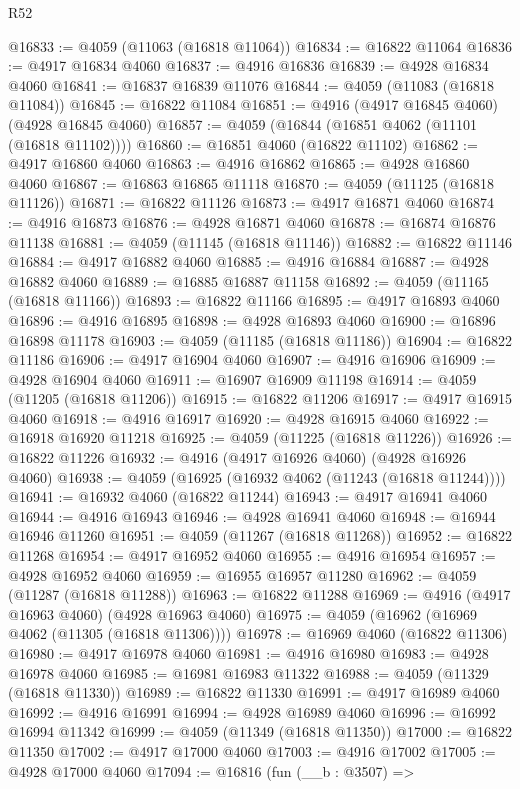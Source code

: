 \begin{lexlean}{R52}
\begin{coremodule}
@16833 := @4059 (@11063 (@16818 @11064))
@16834 := @16822 @11064
@16836 := @4917 @16834 @4060
@16837 := @4916 @16836
@16839 := @4928 @16834 @4060
@16841 := @16837 @16839 @11076
@16844 := @4059 (@11083 (@16818 @11084))
@16845 := @16822 @11084
@16851 := @4916 (@4917 @16845 @4060) (@4928 @16845 @4060)
@16857 := @4059 (@16844 (@16851 @4062 (@11101 (@16818 @11102))))
@16860 := @16851 @4060 (@16822 @11102)
@16862 := @4917 @16860 @4060
@16863 := @4916 @16862
@16865 := @4928 @16860 @4060
@16867 := @16863 @16865 @11118
@16870 := @4059 (@11125 (@16818 @11126))
@16871 := @16822 @11126
@16873 := @4917 @16871 @4060
@16874 := @4916 @16873
@16876 := @4928 @16871 @4060
@16878 := @16874 @16876 @11138
@16881 := @4059 (@11145 (@16818 @11146))
@16882 := @16822 @11146
@16884 := @4917 @16882 @4060
@16885 := @4916 @16884
@16887 := @4928 @16882 @4060
@16889 := @16885 @16887 @11158
@16892 := @4059 (@11165 (@16818 @11166))
@16893 := @16822 @11166
@16895 := @4917 @16893 @4060
@16896 := @4916 @16895
@16898 := @4928 @16893 @4060
@16900 := @16896 @16898 @11178
@16903 := @4059 (@11185 (@16818 @11186))
@16904 := @16822 @11186
@16906 := @4917 @16904 @4060
@16907 := @4916 @16906
@16909 := @4928 @16904 @4060
@16911 := @16907 @16909 @11198
@16914 := @4059 (@11205 (@16818 @11206))
@16915 := @16822 @11206
@16917 := @4917 @16915 @4060
@16918 := @4916 @16917
@16920 := @4928 @16915 @4060
@16922 := @16918 @16920 @11218
@16925 := @4059 (@11225 (@16818 @11226))
@16926 := @16822 @11226
@16932 := @4916 (@4917 @16926 @4060) (@4928 @16926 @4060)
@16938 := @4059 (@16925 (@16932 @4062 (@11243 (@16818 @11244))))
@16941 := @16932 @4060 (@16822 @11244)
@16943 := @4917 @16941 @4060
@16944 := @4916 @16943
@16946 := @4928 @16941 @4060
@16948 := @16944 @16946 @11260
@16951 := @4059 (@11267 (@16818 @11268))
@16952 := @16822 @11268
@16954 := @4917 @16952 @4060
@16955 := @4916 @16954
@16957 := @4928 @16952 @4060
@16959 := @16955 @16957 @11280
@16962 := @4059 (@11287 (@16818 @11288))
@16963 := @16822 @11288
@16969 := @4916 (@4917 @16963 @4060) (@4928 @16963 @4060)
@16975 := @4059 (@16962 (@16969 @4062 (@11305 (@16818 @11306))))
@16978 := @16969 @4060 (@16822 @11306)
@16980 := @4917 @16978 @4060
@16981 := @4916 @16980
@16983 := @4928 @16978 @4060
@16985 := @16981 @16983 @11322
@16988 := @4059 (@11329 (@16818 @11330))
@16989 := @16822 @11330
@16991 := @4917 @16989 @4060
@16992 := @4916 @16991
@16994 := @4928 @16989 @4060
@16996 := @16992 @16994 @11342
@16999 := @4059 (@11349 (@16818 @11350))
@17000 := @16822 @11350
@17002 := @4917 @17000 @4060
@17003 := @4916 @17002
@17005 := @4928 @17000 @4060
@17094 := @16816
    (fun (__b : @3507) =>

\end{coremodule}
\end{lexlean}
